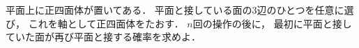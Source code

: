 \documentclass[../../main.tex]{subfiles}
\begin{document}
平面上に正四面体が置いてある．
平面と接している面の3辺のひとつを任意に選び，
これを軸として正四面体をたおす．
$n$回の操作の後に，
最初に平面と接していた面が再び平面と接する確率を求めよ．
\end{document}
